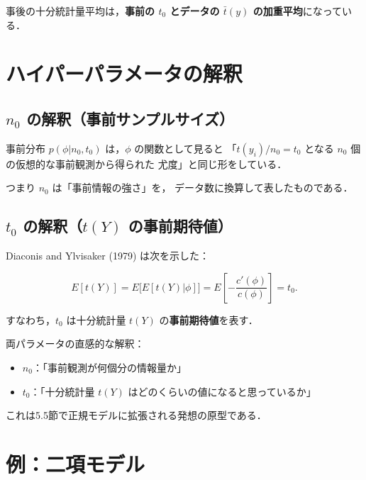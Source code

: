 \documentclass[lualatex,ja=standard,a4paper,12pt]{bxjsarticle}
\begin{document}
\medskip
事後の十分統計量平均は，\textbf{事前の $t_0$ とデータの $\bar{t}(y)$ の加重平均}になっている．

\section{ハイパーパラメータの解釈}

\subsection*{$n_0$ の解釈（事前サンプルサイズ）}

事前分布 $p(\phi|n_0, t_0)$ は，$\phi$ の関数として見ると
「$t(y_i)/n_0 = t_0$ となる $n_0$ 個の仮想的な事前観測から得られた
尤度」と同じ形をしている．

つまり $n_0$ は「事前情報の強さ」を，
データ数に換算して表したものである．

\subsection*{$t_0$ の解釈（$t(Y)$ の事前期待値）}

Diaconis and Ylvisaker (1979) は次を示した：

\[
  E[t(Y)] = E\!\bigl[E[t(Y)|\phi]\bigr]
  = E\!\left[-\frac{c'(\phi)}{c(\phi)}\right] = t_0.
\]

すなわち，$t_0$ は十分統計量 $t(Y)$ の\textbf{事前期待値}を表す．

\begin{pointbox}
両パラメータの直感的な解釈：
\begin{itemize}
  \item $n_0$：「事前観測が何個分の情報量か」
  \item $t_0$：「十分統計量 $t(Y)$ はどのくらいの値になると思っているか」
\end{itemize}
これは5.5節で正規モデルに拡張される発想の原型である．
\end{pointbox}

\section{例：二項モデル}
\end{document}

